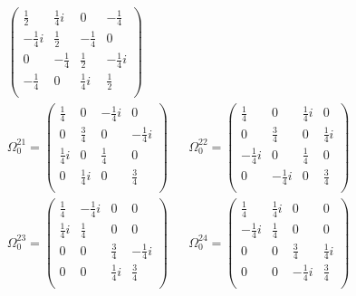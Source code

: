 \begin{align*}
\begin{pmatrix}
    \frac{1}{2}  &  \frac{1}{4}i  &  0  &  -\frac{1}{4}  \\
    -\frac{1}{4}i  &  \frac{1}{2}  &  -\frac{1}{4}  &  0  \\
    0  &  -\frac{1}{4}  &  \frac{1}{2}  &  -\frac{1}{4}i  \\
    -\frac{1}{4}  &  0  &  \frac{1}{4}i  &  \frac{1}{2}  \\
    \end{pmatrix}
    \\
    \Omega_{0}^{21} = 
    \begin{pmatrix}
    \frac{1}{4}  &  0  &  -\frac{1}{4}i  &  0  \\
    0  &  \frac{3}{4}  &  0  &  -\frac{1}{4}i  \\
    \frac{1}{4}i  &  0  &  \frac{1}{4}  &  0  \\
    0  &  \frac{1}{4}i  &  0  &  \frac{3}{4}  \\
    \end{pmatrix}
    &&
    \Omega_{0}^{22} = 
    \begin{pmatrix}
    \frac{1}{4}  &  0  &  \frac{1}{4}i  &  0  \\
    0  &  \frac{3}{4}  &  0  &  \frac{1}{4}i  \\
    -\frac{1}{4}i  &  0  &  \frac{1}{4}  &  0  \\
    0  &  -\frac{1}{4}i  &  0  &  \frac{3}{4}  \\
    \end{pmatrix}
    \\
    \Omega_{0}^{23} = 
    \begin{pmatrix}
    \frac{1}{4}  &  -\frac{1}{4}i  &  0  &  0  \\
    \frac{1}{4}i  &  \frac{1}{4}  &  0  &  0  \\
    0  &  0  &  \frac{3}{4}  &  -\frac{1}{4}i  \\
    0  &  0  &  \frac{1}{4}i  &  \frac{3}{4}  \\
    \end{pmatrix}
    &&
    \Omega_{0}^{24} = 
    \begin{pmatrix}
    \frac{1}{4}  &  \frac{1}{4}i  &  0  &  0  \\
    -\frac{1}{4}i  &  \frac{1}{4}  &  0  &  0  \\
    0  &  0  &  \frac{3}{4}  &  \frac{1}{4}i  \\
    0  &  0  &  -\frac{1}{4}i  &  \frac{3}{4}  \\
    \end{pmatrix}
    \\

\end{align*}
